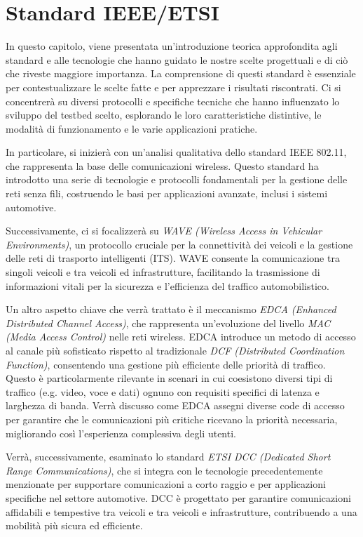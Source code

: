 \chapter{Standard IEEE/ETSI}

In questo capitolo, viene presentata un'introduzione teorica approfondita agli standard e alle tecnologie che hanno guidato le nostre scelte progettuali e di ciò che riveste maggiore importanza. La comprensione di questi standard è essenziale per contestualizzare le scelte fatte e per apprezzare i risultati riscontrati. Ci si concentrerà su diversi protocolli e specifiche tecniche che hanno influenzato lo sviluppo del testbed scelto, esplorando le loro caratteristiche distintive, le modalità di funzionamento e le varie applicazioni pratiche.

In particolare, si inizierà con un'analisi qualitativa dello standard IEEE 802.11, che rappresenta la base delle comunicazioni wireless. Questo standard ha introdotto una serie di tecnologie e protocolli fondamentali per la gestione delle reti senza fili, costruendo le basi per applicazioni avanzate, inclusi i sistemi automotive.

Successivamente, ci si focalizzerà su \textit{WAVE (Wireless Access in Vehicular Environments)}, un protocollo cruciale per la connettività dei veicoli e la gestione delle reti di trasporto intelligenti (ITS). WAVE consente la comunicazione tra singoli veicoli e tra veicoli ed infrastrutture, facilitando la trasmissione di informazioni vitali per la sicurezza e l'efficienza del traffico automobilistico.

Un altro aspetto chiave che verrà trattato è il meccanismo \textit{EDCA (Enhanced Distributed Channel Access)}, che rappresenta un'evoluzione del livello \textit{MAC (Media Access Control)} nelle reti wireless. EDCA introduce un metodo di accesso al canale più sofisticato rispetto al tradizionale \textit{DCF (Distributed Coordination Function)}, consentendo una gestione più efficiente delle priorità di traffico. Questo è particolarmente rilevante in scenari in cui coesistono diversi tipi di traffico (e.g. video, voce e dati) ognuno con requisiti specifici di latenza e larghezza di banda. Verrà discusso come EDCA assegni diverse code di accesso per garantire che le comunicazioni più critiche ricevano la priorità necessaria, migliorando così l'esperienza complessiva degli utenti.

Verrà, successivamente, esaminato lo standard \textit{ETSI DCC (Dedicated Short Range Communications)}, che si integra con le tecnologie precedentemente menzionate per supportare comunicazioni a corto raggio e per applicazioni specifiche nel settore automotive. DCC è progettato per garantire comunicazioni affidabili e tempestive tra veicoli e tra veicoli e infrastrutture, contribuendo a una mobilità più sicura ed efficiente.


